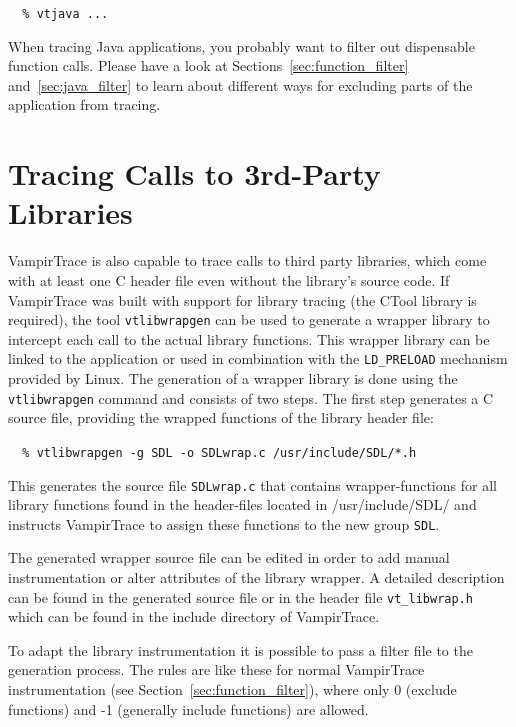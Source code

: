 \documentclass[a4paper,twoside,12pt,BCOR12mm]{scrbook}
\begin{document}
  \vspace{1ex}
  \verb|  % vtjava ...                 |
  \vspace{1ex}

  When tracing Java applications, you probably want to filter out dispensable
  function calls. Please have a look at Sections~\ref{sec:function_filter}
  and~\ref{sec:java_filter} to learn about different ways for excluding parts of the
  application from tracing.
  
\section{Tracing Calls to 3rd-Party Libraries}
\label{sec:3rd-party}
  VampirTrace is also capable to trace calls to third party libraries, which come with
  at least one C header file even without the library's source code. If VampirTrace was
  built with support for library tracing (the CTool library is required), 
  the tool \texttt{vtlibwrapgen} can be used to
  generate a wrapper library to intercept each call to the actual library functions.
  This wrapper library can be linked to the application or used in combination with the
  \texttt{LD\_PRELOAD} mechanism provided by Linux.
  The generation of a wrapper library is done using the \texttt{vtlibwrapgen} 
  command and consists of two steps. The first step generates a C source file, 
  providing the wrapped functions of the library header file:
	
  \vspace{1ex}
  \verb|  % vtlibwrapgen -g SDL -o SDLwrap.c /usr/include/SDL/*.h|
  \vspace{1ex}

  This generates the source file \texttt{SDLwrap.c} that contains wrapper-functions for
  all library functions found in the header-files located in /usr/include/SDL/ and
  instructs VampirTrace to assign these functions to the new group \texttt{SDL}.

  The generated wrapper source file can be edited in order to add manual instrumentation
  or alter attributes of the library wrapper. A detailed description can be found in the 
  generated source file or in the header file \texttt{vt\_libwrap.h} which can be found in the 
  include directory of VampirTrace.

  To adapt the library instrumentation it is possible to pass a filter file to
  the generation process. The rules are like these for normal VampirTrace instrumentation
  (see Section~\ref{sec:function_filter}), where only 0 (exclude functions) and -1 (generally include
  functions) are allowed.\\
\end{document}
